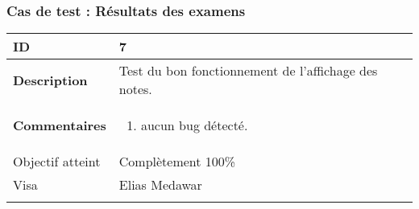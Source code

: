 		 		 \subsubsection*{Cas de test : Résultats des examens}
		 		 		 		 		 \begin{longtable}{m{4cm}|p{10cm}|}
		 		 		 		 		 \textbf{ ID} & 7 \\
		 		 		 		 		 \hline \textbf{Description} &  Test du bon fonctionnement de l'affichage des notes.\\
		 		 		 		 		 \hline \textbf{Commentaires} &  
		 		 		 		 		 	 	 \begin{enumerate}
		 		 					 		 	 		 		 		 	 		\item aucun bug détecté.
		 		 					 		 	 		 					 	\end{enumerate} \\
		 		 	 		 		 		 \hline Objectif atteint & {\color{green} Complètement 100\% \CheckedBox } \\
		 		 					 		 	 		 		 		\hline Visa & Elias Medawar 	\\
		 		 					 		 		 		 		\\
		 		 		 		 \end{longtable} 


